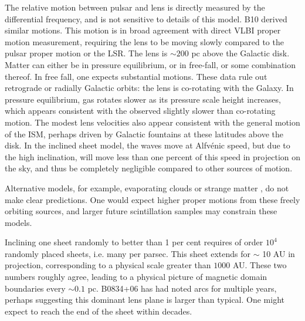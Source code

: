 \documentclass[useAMS,usenatbib]{mn2e}
\begin{document}
The relative motion between pulsar and lens is directly measured by
the differential frequency, and is not sensitive to details of this
model. B10 derived similar motions.  This
motion is in broad agreement with direct VLBI proper motion
measurement, requiring the lens to be moving slowly compared to the
pulsar proper motion or the LSR.  The lens is $\sim200$ pc above the
Galactic disk.  Matter can either be in pressure equilibrium, or in
free-fall, or some combination thereof.  In free fall, one expects
substantial motions.  These data rule out retrograde or radially
Galactic orbits: the lens is co-rotating with the Galaxy.  In pressure
equilibrium, gas rotates slower as its pressure scale height
increases, which appears consistent with the observed slightly slower
than co-rotating motion.  The modest lens velocities also appear
consistent with the general motion of the ISM, perhaps driven by
Galactic fountains \citep{1976ApJ...205..762S} at these latitudes above
the disk.  In the inclined sheet model, the waves move at Alfv\'enic
speed, but due to the high inclination, will move less than one percent of this
speed in projection on the sky, and thus be completely negligible compared to
other sources of motion.

Alternative models, for example, evaporating
clouds \citep{1998ApJ...498L.125W} or strange
matter \citep{2013PhLB..727..357P}, do not make clear predictions.  One
would expect higher proper motions from these freely orbiting sources,
and larger future scintillation samples may constrain these models.

Inclining one sheet randomly to better than 1 per cent requires of
order $10^4$ randomly placed sheets, i.e. many per parsec.  This sheet
extends for $\sim$ 10 AU in projection, corresponding to a physical
scale greater than $1000$ AU.   These two numbers roughly agree,
leading to a physical picture of magnetic domain boundaries every
$\sim 0.1$ pc.  B0834+06 has had noted arcs for multiple years,
perhaps suggesting this dominant lens plane is larger than typical.
One might expect to reach the end of the sheet within decades.
\end{document}
